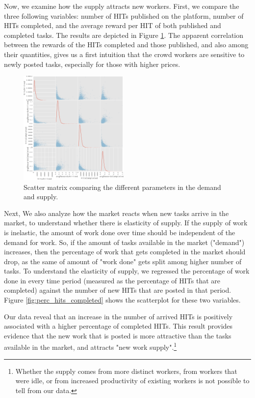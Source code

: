 Now, we examine how the supply attracts new workers. First, we compare the three following variables: number of HITs published on the platform, number of HITs completed, and the average reward per HIT of both published and completed tasks. The results are depicted in Figure \ref{fig:scatter_matrix}. The apparent correlation between the rewards of the HITs completed and those published, and also among their quantities, gives us a first intuition that the crowd workers are sensitive to newly posted tasks, especially for those with higher prices.

\begin{figure}[t!]
	\centering
		\includegraphics[width=0.48\textwidth]{figures/scatter}
	\caption{Scatter matrix comparing the different parameters in the demand and supply.}
	\label{fig:scatter_matrix}
\end{figure}

Next, We also analyze how the market reacts when new tasks arrive in the
market, to understand whether there is elasticity of supply. If the
supply of work is inelastic, the amount of work done over time should
be independent of the demand for work. So, if the amount of tasks
available in the market ("demand") increases, then the percentage of
work that gets completed in the market should drop, as the same of
amount of "work done" gets split among higher number of tasks. To
understand the elasticity of supply, we regressed the percentage of
work done in every time period (measured as the percentage of HITs
that are completed) against the number of new HITs that are posted in
that period. Figure \ref{fig:perc_hits_completed} shows the scatterplot for these two variables.

Our data reveal that an increase in the number of arrived HITs is
positively associated with a higher percentage of completed HITs. This
result provides evidence that the new work that is posted is more
attractive than the tasks available in the market, and attracts "new
work supply".\footnote{Whether the supply comes from more distinct
workers, from workers that were idle, or from increased productivity
of existing workers is not possible to tell from our data.}

